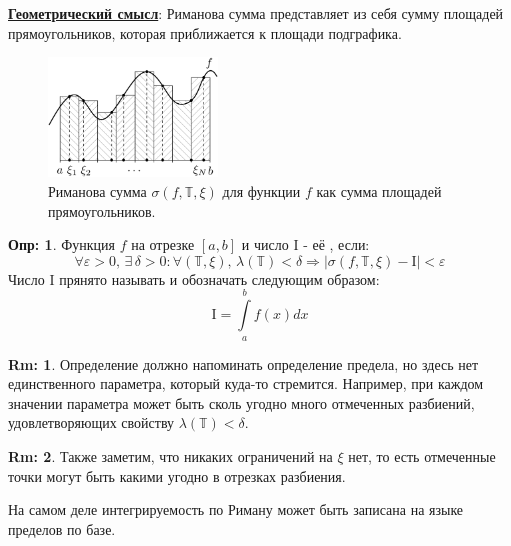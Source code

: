 \documentclass[12pt]{article}
\newcommand{\MTB}{\mathbb{T}}
\newcommand{\MI}{\mathrm{I}}
\newcommand{\VE}{\varepsilon}
\theoremstyle{definition}
\newtheorem{defn}{Опр:}
\newtheorem{rem}{Rm:}
\newcommand{\ddint}[2]{\displaystyle\int\limits_{#1}^{#2}}
\begin{document}
\textbf{\uline{Геометрический смысл}}: Риманова сумма представляет из себя сумму площадей прямоугольников, которая приближается к площади подграфика.
\begin{figure}[H]
	\centering
	\includegraphics[width=0.4\textwidth]{21_3.png}
	\caption{Риманова сумма $\sigma(f, \MTB, \xi)$ для функции $f$ как сумма площадей прямоугольников.}
	\label{21_3}
\end{figure}
\begin{defn}
	Функция $f$  на отрезке $[a,b]$ и число $\MI$ - её , если:
	$$
		\forall \VE > 0,\, \exists \, \delta > 0 \colon \forall (\MTB, \xi), \, \lambda(\MTB) < \delta \Rightarrow |\sigma(f, \MTB, \xi) - \MI| < \VE
	$$
	Число $\MI$ прянято называть  и обозначать следующим образом: 
	$$
		\MI = \ddint{a}{b}f(x)dx
	$$
\end{defn}
\begin{rem}
	Определение должно напоминать определение предела, но здесь нет единственного параметра, который куда-то стремится. Например, при каждом значении параметра может быть сколь угодно много отмеченных разбиений, удовлетворяющих свойству $\lambda(\MTB) < \delta$.
\end{rem}
\begin{rem}
	Также заметим, что никаких ограничений на $\xi$ нет, то есть отмеченные точки могут быть какими угодно в отрезках разбиения.
\end{rem}
На самом деле интегрируемость по Риману может быть записана на языке пределов по базе.
\end{document}
